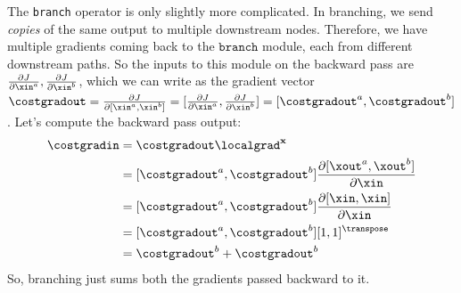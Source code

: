 The \texttt{branch} operator is only slightly more complicated. In branching, we send \textit{copies} of the same output to multiple downstream nodes. Therefore, we have multiple gradients coming back to the $\texttt{branch}$ module, each from different downstream paths. So the inputs to this module on the backward pass are $\frac{\partial J}{\partial \xin^{a}}, \frac{\partial J}{\partial \xin^{b}}$, which we can write as the gradient vector $\costgradout = \frac{\partial J}{\partial [\xin^a, \xin^b]} = [\frac{\partial J}{\partial \xin^{a}}, \frac{\partial J}{\partial \xin^{b}}] = [\costgradout^a, \costgradout^b]$.  Let's compute the backward pass output:
\begin{align}
    \costgradin &= \costgradout \localgrad^{\mathbf{x}}\\
    &= [\costgradout^a, \costgradout^b] \frac{\partial [\xout^a, \xout^b]}{\partial \xin}\\
    &= [\costgradout^a, \costgradout^b] \frac{\partial [\xin, \xin]}{\partial \xin}\\
    &= [\costgradout^a, \costgradout^b][1, 1]^\transpose\\
    &= \costgradout^b + \costgradout^b
\end{align}
So, branching just sums both the gradients passed backward to it.

